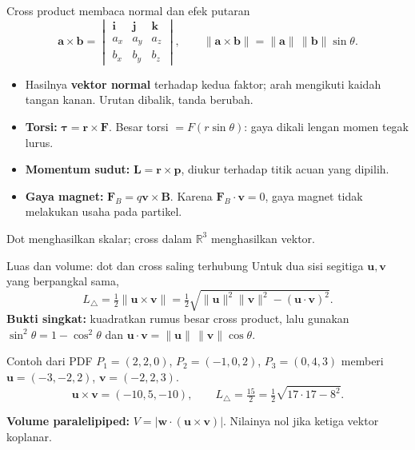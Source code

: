 \documentclass[11pt,aspectratio=169]{beamer}
\newcommand{\vect}[1]{\boldsymbol{#1}}
\newcommand{\R}{\mathbb{R}}
\begin{document}
\begin{frame}{Cross product membaca normal dan efek putaran}
\[
\vect{a}\times\vect{b}
=\begin{vmatrix}\mathbf{i}&\mathbf{j}&\mathbf{k}\\a_x&a_y&a_z\\b_x&b_y&b_z\end{vmatrix},
\qquad
\|\vect{a}\times\vect{b}\|=\|\vect{a}\|\,\|\vect{b}\|\sin\theta.
\]
\small
\begin{itemize}
\item Hasilnya \textbf{vektor normal} terhadap kedua faktor; arah mengikuti
kaidah tangan kanan. Urutan dibalik, tanda berubah.
\item \textbf{Torsi:} $\vect{\tau}=\vect{r}\times\vect{F}$.
Besar torsi $=F(r\sin\theta)$: gaya dikali lengan momen tegak lurus.
\item \textbf{Momentum sudut:} $\vect{L}=\vect{r}\times\vect{p}$,
diukur terhadap titik acuan yang dipilih.
\item \textbf{Gaya magnet:} $\vect{F}_B=q\vect{v}\times\vect{B}$.
Karena $\vect{F}_B\cdot\vect{v}=0$, gaya magnet tidak melakukan usaha pada partikel.
\end{itemize}
\textcolor{Accent}{Dot menghasilkan skalar; cross dalam $\R^3$ menghasilkan vektor.}
\end{frame}

\begin{frame}{Luas dan volume: dot dan cross saling terhubung}
\small
Untuk dua sisi segitiga $\vect{u},\vect{v}$ yang berpangkal sama,
\[
L_\triangle=\tfrac12\|\vect{u}\times\vect{v}\|
=\tfrac12\sqrt{\|\vect{u}\|^2\|\vect{v}\|^2-(\vect{u}\cdot\vect{v})^2}.
\]
\textbf{Bukti singkat:} kuadratkan rumus besar cross product,
lalu gunakan $\sin^2\theta=1-\cos^2\theta$ dan
$\vect{u}\cdot\vect{v}=\|\vect{u}\|\,\|\vect{v}\|\cos\theta$.
\begin{block}{Contoh dari PDF}
$P_1=(2,2,0)$, $P_2=(-1,0,2)$, $P_3=(0,4,3)$ memberi
$\vect{u}=(-3,-2,2)$, $\vect{v}=(-2,2,3)$.
\[
\vect{u}\times\vect{v}=(-10,5,-10),\qquad
L_\triangle=\tfrac{15}{2}=\tfrac12\sqrt{17\cdot17-8^2}.
\]
\end{block}
\textbf{Volume paralelipiped:} $V=|\vect{w}\cdot(\vect{u}\times\vect{v})|$.
Nilainya nol jika ketiga vektor koplanar.
\end{frame}
\end{document}
